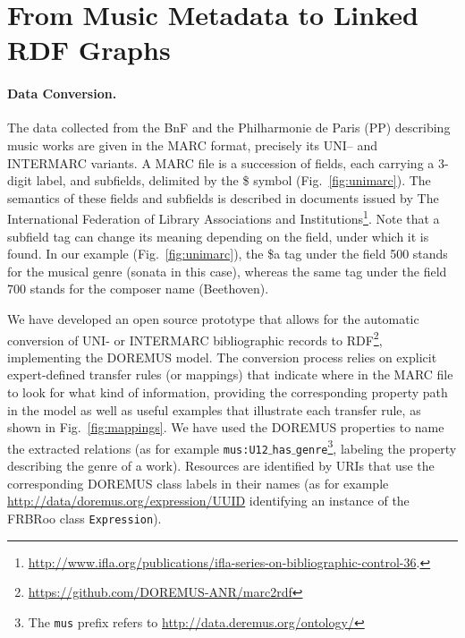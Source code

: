 \documentclass[runningheads,a4paper]{llncs}
\begin{document}
\section{From Music Metadata to Linked RDF Graphs}
\label{sec:conversion}

\paragraph{{\bf Data Conversion.}}

The data collected from the BnF and the Philharmonie de Paris (PP) describing music works are given in the MARC format, precisely its UNI-- and INTERMARC variants. A MARC file is a succession of fields, each carrying a 3-digit label, and subfields, delimited by the \$ symbol (Fig.~\ref{fig:unimarc}). The semantics of these fields and subfields is described in documents issued by The International Federation of Library Associations and Institutions\footnote{\url{http://www.ifla.org/publications/ifla-series-on-bibliographic-control-36}.}. %
Note that a subfield tag can change its meaning depending on the field, under which it is found. In our example (Fig.~\ref{fig:unimarc}), the \$a tag under the field 500 stands for the musical genre (sonata in this case), whereas the same tag under the field 700 stands for the composer name (Beethoven).

We have developed an open source prototype that allows for the automatic conversion of UNI- or INTERMARC bibliographic records to RDF\footnote{\url{https://github.com/DOREMUS-ANR/marc2rdf}}, implementing the DOREMUS model. The conversion process relies on explicit expert-defined transfer rules (or mappings) that indicate where in the MARC file to look for what kind of information, providing the corresponding property path in the model as well as useful examples that illustrate each transfer rule, as shown in Fig.~\ref{fig:mappings}. %
We have used the DOREMUS properties to name the extracted relations (as for example \texttt{mus:U12$\_$has$\_$genre}\footnote{The \texttt{mus} prefix refers to \url{http://data.deremus.org/ontology/}}, labeling the property describing the genre of a work).  Resources are identified by URIs that use the corresponding DOREMUS class labels in their names (as for example \url{http://data/doremus.org/expression/UUID} identifying an instance of the FRBRoo class \texttt{Expression}).
\end{document}
